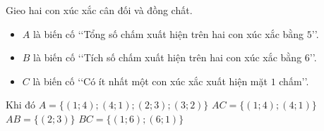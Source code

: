 \begin{ex}%
 Gieo hai con xúc  xắc cân đối và đồng chất.
 \begin{itemize}
   \item $A$ là biến cố \lq\lq Tổng số chấm xuất hiện trên hai con xúc xắc bằng $5$\rq\rq.
  \item $B$ là biến cố  \lq\lq Tích số chấm xuất hiện trên hai con xúc xắc bằng $6$\rq\rq.
  \item $C$ là biến cố \lq\lq Có ít nhất một con xúc xắc xuất hiện  mặt $1$ chấm\rq\rq.
 \end{itemize}
  Khi đó
 \choiceTF 
  {\True  $A=\{(1;4);(4;1);(2;3);(3;2)\}$}
  {\True  $AC=\{(1;4);(4;1)\}$}
   {$AB=\{(2;3)\}$}
  {\True  $BC=\{(1;6);(6;1)\}$}
\end{ex}

